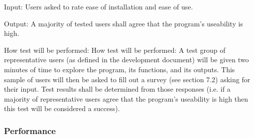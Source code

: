 \documentclass[12pt, titlepage]{article}
\begin{document}
\begin{enumerate}
Input: Users asked to rate ease of installation and ease of use.
					
Output: A majority of tested users shall agree  that the program's useability is high.
					
How test will be performed: How test will be performed: A test group of representative users (as defined in the development document) will be given two minutes of time to explore the program, its functions, and its outputs. This sample of users will then be asked to fill out a survey (see section 7.2) asking for their input. Test results shall be determined from those responses (i.e. if a majority of representative users agree that the program's useability is high then this test will be considered a success).

\end{enumerate}

\subsubsection{Performance}
\end{document}
